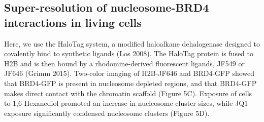 \documentclass{ucetd}
\begin{document}

\subsection{Super-resolution of nucleosome-BRD4 interactions in living cells}

Here, we use the HaloTag system, a modified haloalkane dehalogenase designed to covalently bind to synthetic ligands  (Los 2008). The HaloTag protein is fused to H2B and is then bound by a rhodomine-derived fluorescent ligands, JF549 or JF646 (Grimm 2015). Two-color imaging of H2B-JF646 and BRD4-GFP showed that BRD4-GFP is present in nucleosome depleted regions, and that BRD4-GFP makes direct contact with the chromatin scaffold (Figure 5C). Exposure of cells to 1,6 Hexanediol promoted an increase in nucleosome cluster sizes, while JQ1 exposure significantly condensed nucleosome clusters (Figure 5D). 
\end{document}
